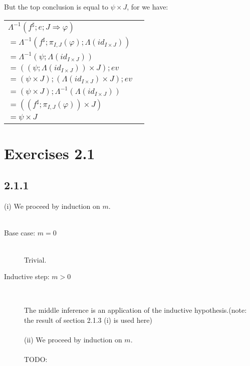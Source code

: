 \documentclass{article}
\begin{document}
But the top conclusion is equal to $\psi \times J$, for we have:
\begin{center}
\begin{tabular}{ll}
$\Lambda^{-1}(f^\sharp;e;J \Rightarrow \varphi)$ &  \\
$= \Lambda^{-1}(f^\sharp;\pi_{I,J}(\varphi);\Lambda(\mathit{id_{I \times J}}))$ &  \\ 
$= \Lambda^{-1}(\psi;\Lambda(\mathit{id_{I \times J}}))$ &  \\ 
$= ((\psi;\Lambda(\mathit{id_{I \times J}})) \times J);\mathit{ev}$ &  \\ 
$= (\psi \times J);(\Lambda(\mathit{id_{I \times J}}) \times J);\mathit{ev}$ & \\
$= (\psi \times J);\Lambda^{-1}(\Lambda(\mathit{id_{I \times J}}))$ & \\
$= ((f^\sharp;\pi_{I,J}(\varphi)) \times J)$ & \\
$= \psi \times J$ &
\end{tabular}
\end{center}

\section*{Exercises 2.1}

\subsection*{2.1.1}

(i) We proceed by induction on $m$.\\~\\
\begin{description}

\item[Base case: $m = 0$]~\\

Trivial.

\item[Inductive step: $m > 0$]~\\

\begin{prooftree}

\end{prooftree}

The middle inference is an application of the inductive hypothesis.(note: the result of section 2.1.3 (i) is used here) \\~\\
(ii) We proceed by induction on $m$.\\~\\
TODO:

\end{description}
\end{document}
